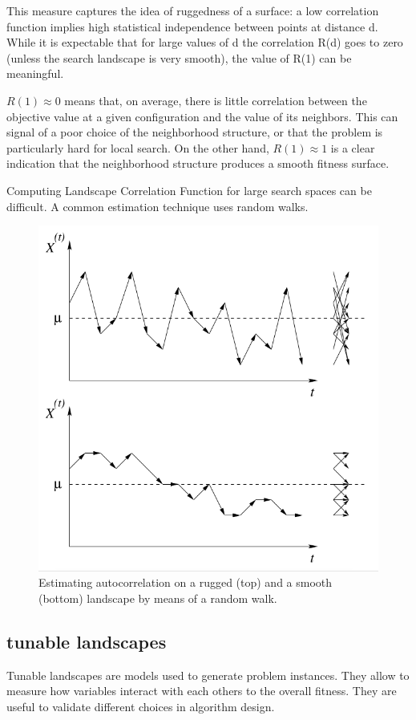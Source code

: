 \documentclass[10pt]{article}
\begin{document}
This measure captures the idea of ruggedness of a surface: a low correlation function implies high statistical independence between points at distance d. While it is expectable that for large values of d the correlation R(d) goes to zero (unless the search landscape is very smooth), the value of R(1) can be meaningful.

$ R(1) \approx 0 $ means that, on average, there is little correlation
between the objective value at a given configuration and the value of its neighbors. This can signal of a poor choice of the neighborhood structure, or that the problem is particularly hard for local search. On the other hand, $ R(1)  \approx 1 $ is a clear indication that the neighborhood structure produces a smooth fitness surface.

Computing Landscape Correlation Function for large search spaces can be difficult. A common estimation technique uses random walks.

\begin{figure}[H]
\includegraphics[scale=0.60]{randomw}
\centering
\caption{Estimating autocorrelation on a rugged (top) and a smooth (bottom) landscape by means of a random walk.}
\end{figure}

\subsection{tunable landscapes}
Tunable landscapes are models used to generate problem instances. They allow to measure how variables interact with each others to the overall fitness. They are useful to validate different choices in algorithm design.
 
\end{document}
